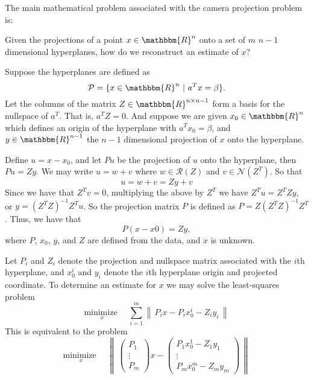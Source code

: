 \documentclass[11pt]{article}
\date{\today}
\date{\today}
\newcommand{\norm}[1]{\left\lVert\,#1\,\right\rVert}
\newcommand{\pmat}[1]{\begin{pmatrix}#1\end{pmatrix}}
\newcommand{\R}{\mathbbm{R}}
\newcommand{\dims}[2]{\R^{#1 \times #2}}
\newcommand{\range}{\mathcal{R}}
\newcommand{\nullspace}{\mathcal{N}}
\newcommand{\minimize}{\text{minimize }}
\begin{document}
 


The main mathematical problem associated with the camera projection 
problem is: 

Given the projections of a point $x \in \R^n$ onto a set of $m$ 
$n-1$ dimensional hyperplanes, how do we reconstruct an estimate of
$x$?

Suppose the hyperplanes are defined as 
\[
\mathcal{P} = \{ x \in \R^n \ |\ a^T x = \beta  \}.
\] 
Let the columns of the matrix $Z \in \dims{n}{n-1}$ form a basis for
the nullspace of $a^T$. That is, $a^T Z = 0$.  And suppose we are
given $x_0 \in \R^n$ which defines an origin of the hyperplane with
$a^T x_0 = \beta$, and $y \in \R^{n-1}$ the $n-1$ dimensional
projection of $x$ onto the hyperplane.

Define $u = x - x_0$, and let $P u$ be the projection of $u$ onto the
hyperplane, then $Pu = Z y$. We may write $u = w + v$ where $w \in
\range(Z)$ and $v \in \nullspace(Z^T)$.  So that
\[ 
u = w + v = Z y + v 
\] 
Since we have that $Z^T v = 0$, multiplying the above by $Z^T$ we have
$Z^T u = Z^T Z y$, or $y = (Z^T Z)^{-1} Z^T u$.  So the projection
matrix $P$ is defined as $P = Z (Z^T Z)^{-1} Z^T$. Thus, we have
that 
\[
P (x - x0) = Z y,
\]
where $P$, $x_0$, $y$, and $Z$ are defined from the data, and $x$ 
is unknown. 

Let $P_i$ and $Z_i$ denote the projection and nullspace matrix 
associated with the $i$th hyperplane, and $x_0^i$ and $y_i$ 
denote the $i$th hyperplane origin and projected coordinate. 
To determine an estimate for $x$ we may solve the least-squares
problem 
\begin{equation}
\underset{x}{\minimize}  \quad  \sum_{i=1}^m \norm{ P_i x - P_i x_0^i - Z_i y_i} 
\end{equation}
This is equivalent to the problem 
\[
\underset{x}{\minimize} \quad \norm{ \pmat{P_1 \\ \vdots \\ P_m } x 
                                    -\pmat{P_1 x_0^1 - Z_1 y_1 \\ \vdots \\ P_m x_0^m - Z_m y_m} }
\]




    
\end{document}
